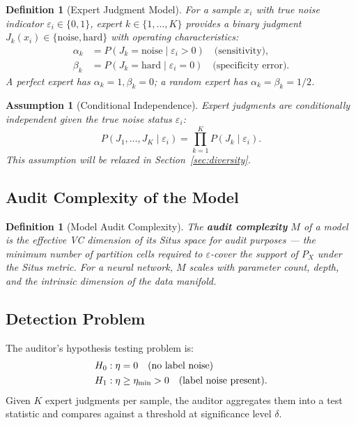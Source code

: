 \documentclass[12pt,a4paper]{article}
\newtheorem{definition}[theorem]{Definition}
\newtheorem{assumption}[theorem]{Assumption}
\begin{document}
\begin{definition}[Expert Judgment Model]
\label{def:expert}
For a sample $x_i$ with true noise indicator $\varepsilon_i\in\{0,1\}$, expert
$k\in\{1,\dots,K\}$ provides a binary judgment
$J_k(x_i)\in\{\mathrm{noise},\mathrm{hard}\}$ with operating characteristics:
\begin{align}
    \alpha_k &= P(J_k=\mathrm{noise}\mid\varepsilon_i>0)
               \quad\text{(sensitivity)}, \label{eq:alpha}\\
    \beta_k  &= P(J_k=\mathrm{hard}\mid\varepsilon_i=0)
               \quad\text{(specificity error)}. \label{eq:beta}
\end{align}
A perfect expert has $\alpha_k=1,\beta_k=0$; a random expert has
$\alpha_k=\beta_k=1/2$.
\end{definition}

\begin{assumption}[Conditional Independence]
\label{ass:independence}
Expert judgments are conditionally independent given the true noise status
$\varepsilon_i$:
\begin{equation}\label{eq:cond-indep}
    P(J_1,\dots,J_K\mid\varepsilon_i) =
    \prod_{k=1}^K P(J_k\mid\varepsilon_i).
\end{equation}
This assumption will be relaxed in Section~\ref{sec:diversity}.
\end{assumption}

\subsection{Audit Complexity of the Model}

\begin{definition}[Model Audit Complexity]
\label{def:model-complexity}
The \textbf{audit complexity} $M$ of a model is the effective VC dimension of
its Situs space for audit purposes — the minimum number of partition cells
required to $\varepsilon$-cover the support of $P_X$ under the Situs metric.
For a neural network, $M$ scales with parameter count, depth, and the
intrinsic dimension of the data manifold.
\end{definition}

\subsection{Detection Problem}

The auditor's hypothesis testing problem is:
\begin{align}
    H_0&: \eta = 0 \quad\text{(no label noise)}\notag\\
    H_1&: \eta \geq \eta_{\min} > 0 \quad\text{(label noise present)}.
    \label{eq:hypotheses}
\end{align}
Given $K$ expert judgments per sample, the auditor aggregates them into a test
statistic and compares against a threshold at significance level $\delta$.
\end{document}
